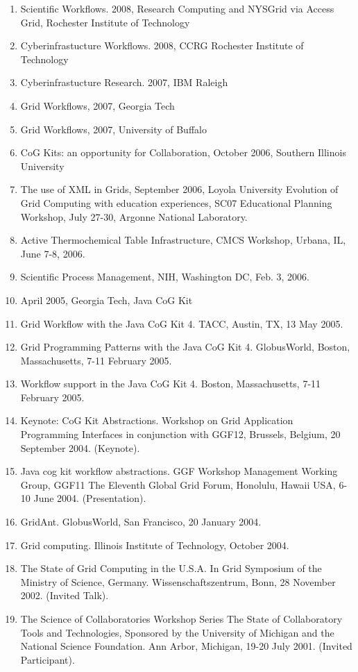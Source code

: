 \documentclass{article}
\begin{document}
\begin{enumerate}
\item  Scientific Workflows. 2008, Research Computing and NYSGrid via Access Grid, Rochester Institute of Technology 
\item  Cyberinfrastucture Workflows. 2008, CCRG Rochester Institute of Technology 
\item  Cyberinfrastucture Research. 2007, IBM Raleigh 
\item  Grid Workflows, 2007, Georgia Tech
\item  Grid Workflows, 2007, University of Buffalo
\item  CoG Kits: an opportunity for Collaboration, October 2006, Southern Illinois University  
\item  The use of XML in Grids, September 2006, Loyola University Evolution of Grid Computing with education experiences, SC07 Educational Planning Workshop, July  27-30, Argonne National Laboratory. 
\item  Active Thermochemical Table Infrastructure, CMCS Workshop, Urbana, IL, June 7-8, 2006. 
\item  Scientific Process Management, NIH, Washington DC, Feb. 3, 2006. 
\item  April 2005, Georgia Tech, Java CoG Kit 
\item  Grid Workflow with the Java CoG Kit 4. TACC, Austin, TX, 13 May 2005. 
\item  Grid Programming Patterns with the Java CoG Kit 4. GlobusWorld, Boston, Massachusetts, 7-11 February 2005. 
\item  Workflow support in the Java CoG Kit 4. Boston, Massachusetts, 7-11 February 2005. 
\item  Keynote: CoG Kit Abstractions. Workshop on Grid Application Programming Interfaces in conjunction with GGF12, Brussels, Belgium, 20 September 2004. (Keynote). %
\item  Java cog kit workflow abstractions. GGF Workshop Management Working Group, GGF11 The Eleventh Global Grid Forum, Honolulu, Hawaii USA, 6-10 June 2004. (Presentation). 
\item  GridAnt. GlobusWorld, San Francisco, 20 January 2004. 
\item  Grid computing. Illinois Institute of Technology, October 2004. 
\item  The State of Grid Computing in the U.S.A. In Grid Symposium of the Ministry of Science, Germany. Wissenschaftszentrum, Bonn, 28 November 2002. (Invited Talk). 
\item  The Science of Collaboratories Workshop Series The State of Collaboratory Tools and Technologies, Sponsored by the University of Michigan and the National Science Foundation. Ann Arbor, Michigan, 19-20 July 2001. (Invited Participant). 

\end{enumerate}
\end{document}
